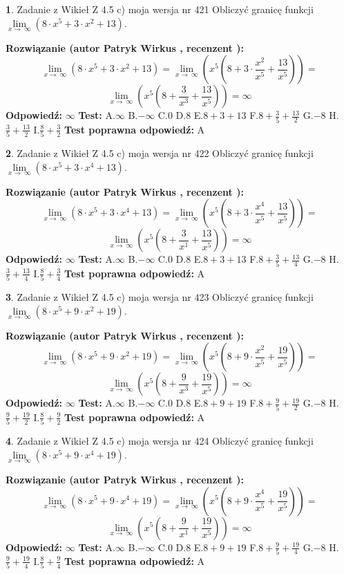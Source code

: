\documentclass[12pt, a4paper]{article}
\theoremstyle{definition} %
\newtheorem{zad}{}
\newcommand{\zadStart}[1]{\begin{zad}#1\newline}
\newcommand{\zadStop}{\end{zad}}
\newcommand{\rozwStart}[2]{\noindent \textbf{Rozwiązanie (autor #1 , recenzent #2): }\newline}
\newcommand{\rozwStop}{\newline}
\newcommand{\odpStart}{\noindent \textbf{Odpowiedź:}\newline}
\newcommand{\odpStop}{\newline}
\newcommand{\testStart}{\noindent \textbf{Test:}\newline}
\newcommand{\testStop}{\newline}
\newcommand{\kluczStart}{\noindent \textbf{Test poprawna odpowiedź:}\newline}
\newcommand{\kluczStop}{\newline}
\begin{document}
\zadStart{Zadanie z Wikieł Z 4.5 c) moja wersja nr 421}
Obliczyć granicę funkcji  $\lim\limits_{x\to\ \infty}(8 \cdot x^{5}+3 \cdot x^{2}+13)$.
\zadStop
\rozwStart{Patryk Wirkus}{}
$$\lim\limits_{x\to\ \infty}(8 \cdot x^{5}+3 \cdot x^{2}+13) = \lim\limits_{x\to\ \infty}(x^{5}(8 +3 \cdot \frac{x^{2}}{x^{5}}+\frac{13}{x^{5}})) =$$ $$\lim\limits_{x\to\ \infty}(x^{5}(8 +\frac{3}{x^{3}}+\frac{13}{x^{5}})) =\infty$$
\rozwStop
\odpStart
$\infty$
\odpStop
\testStart
A.$\infty$ B.$-\infty$ C.$0$ D.$8$ E.$8 + 3 + 13$
F.$8+\frac{3}{5}+\frac{13}{2}$ G.$-8$
H.$\frac{3}{5}+\frac{13}{2}$
I.$\frac{8}{5}+\frac{3}{2}$
\testStop
\kluczStart
A
\kluczStop



\zadStart{Zadanie z Wikieł Z 4.5 c) moja wersja nr 422}
Obliczyć granicę funkcji  $\lim\limits_{x\to\ \infty}(8 \cdot x^{5}+3 \cdot x^{4}+13)$.
\zadStop
\rozwStart{Patryk Wirkus}{}
$$\lim\limits_{x\to\ \infty}(8 \cdot x^{5}+3 \cdot x^{4}+13) = \lim\limits_{x\to\ \infty}(x^{5}(8 +3 \cdot \frac{x^{4}}{x^{5}}+\frac{13}{x^{5}})) =$$ $$\lim\limits_{x\to\ \infty}(x^{5}(8 +\frac{3}{x^{1}}+\frac{13}{x^{5}})) =\infty$$
\rozwStop
\odpStart
$\infty$
\odpStop
\testStart
A.$\infty$ B.$-\infty$ C.$0$ D.$8$ E.$8 + 3 + 13$
F.$8+\frac{3}{5}+\frac{13}{4}$ G.$-8$
H.$\frac{3}{5}+\frac{13}{4}$
I.$\frac{8}{5}+\frac{3}{4}$
\testStop
\kluczStart
A
\kluczStop



\zadStart{Zadanie z Wikieł Z 4.5 c) moja wersja nr 423}
Obliczyć granicę funkcji  $\lim\limits_{x\to\ \infty}(8 \cdot x^{5}+9 \cdot x^{2}+19)$.
\zadStop
\rozwStart{Patryk Wirkus}{}
$$\lim\limits_{x\to\ \infty}(8 \cdot x^{5}+9 \cdot x^{2}+19) = \lim\limits_{x\to\ \infty}(x^{5}(8 +9 \cdot \frac{x^{2}}{x^{5}}+\frac{19}{x^{5}})) =$$ $$\lim\limits_{x\to\ \infty}(x^{5}(8 +\frac{9}{x^{3}}+\frac{19}{x^{5}})) =\infty$$
\rozwStop
\odpStart
$\infty$
\odpStop
\testStart
A.$\infty$ B.$-\infty$ C.$0$ D.$8$ E.$8 + 9 + 19$
F.$8+\frac{9}{5}+\frac{19}{2}$ G.$-8$
H.$\frac{9}{5}+\frac{19}{2}$
I.$\frac{8}{5}+\frac{9}{2}$
\testStop
\kluczStart
A
\kluczStop



\zadStart{Zadanie z Wikieł Z 4.5 c) moja wersja nr 424}
Obliczyć granicę funkcji  $\lim\limits_{x\to\ \infty}(8 \cdot x^{5}+9 \cdot x^{4}+19)$.
\zadStop
\rozwStart{Patryk Wirkus}{}
$$\lim\limits_{x\to\ \infty}(8 \cdot x^{5}+9 \cdot x^{4}+19) = \lim\limits_{x\to\ \infty}(x^{5}(8 +9 \cdot \frac{x^{4}}{x^{5}}+\frac{19}{x^{5}})) =$$ $$\lim\limits_{x\to\ \infty}(x^{5}(8 +\frac{9}{x^{1}}+\frac{19}{x^{5}})) =\infty$$
\rozwStop
\odpStart
$\infty$
\odpStop
\testStart
A.$\infty$ B.$-\infty$ C.$0$ D.$8$ E.$8 + 9 + 19$
F.$8+\frac{9}{5}+\frac{19}{4}$ G.$-8$
H.$\frac{9}{5}+\frac{19}{4}$
I.$\frac{8}{5}+\frac{9}{4}$
\testStop
\kluczStart
A
\kluczStop
\end{document}
